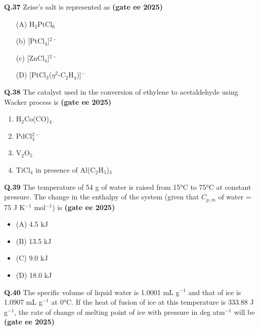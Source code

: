 \documentclass[journal,12pt,onecolumn]{exam}
\theoremstyle{remark}
\begin{document}
\noindent \textbf{Q.37} Zeise's salt is represented as  \hfill{\textbf{(gate ee 2025)}}

\begin{multicols}{2}
\begin{enumerate}[label=(\Alph*)]
\item[(A)] H$_2$PtCl$_6$  
\item[(b)] [PtCl$_4$]$^{2-}$  
\item[(c)] [ZnCl$_4$]$^{2-}$  
\item[(D)] [PtCl$_3$($\eta^2$-C$_2$H$_4$)]$^{-}$  
\end{enumerate}
\end{multicols}
\vspace{0.5cm}

\noindent \textbf{Q.38} The catalyst used in the conversion of ethylene to acetaldehyde using Wacker process is  \hfill{\textbf{(gate ee 2025)}}

\begin{multicols}{2}
\begin{enumerate}[label=(\Alph*)]
\item H$_2$Co(CO)$_4$  
\item PdCl$_4^{2-}$  
\item V$_2$O$_5$  
\item TiCl$_4$ in presence of Al(C$_2$H$_5$)$_3$  
\end{enumerate}
\end{multicols}
\vspace{0.5cm}

\noindent \textbf{Q.39} The temperature of 54 g of water is raised from 15°C to 75°C at constant pressure. The change in the enthalpy of the system (given that $C_{p,m}$ of water = 75 J K$^{-1}$ mol$^{-1}$) is \hfill{\textbf{(gate ee 2025)}}

\begin{multicols}{2}
\begin{itemize}[label={}, leftmargin=*, itemsep=0pt]
\item (A) 4.5 kJ
\item (B) 13.5 kJ
\item (C) 9.0 kJ
\item (D) 18.0 kJ
\end{itemize}
\end{multicols}
\vspace{0.5cm}

\noindent \textbf{Q.40} The specific volume of liquid water is 1.0001 mL g$^{-1}$ and that of ice is 1.0907 mL g$^{-1}$ at 0°C. If the heat of fusion of ice at this temperature is 333.88 J g$^{-1}$, the rate of change of melting point of ice with pressure in deg atm$^{-1}$ will be \hfill{\textbf{(gate ee 2025)}}
\end{document}
